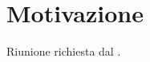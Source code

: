 \documentclass[../template.tex]{subfiles}
\begin{document}
\section{Motivazione}
Riunione richiesta dal \responsabilediprogetto.
\end{document}
